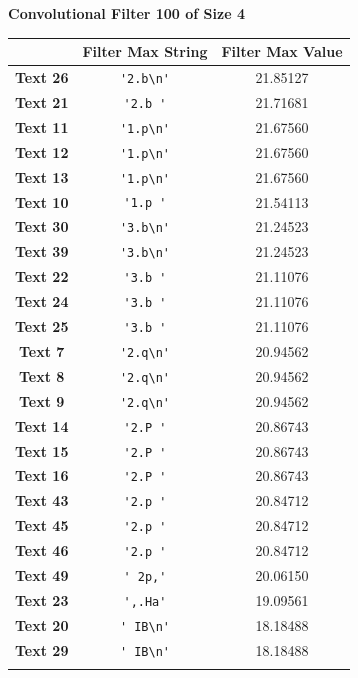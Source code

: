 \begin{table}
    \centering
    \textbf{Convolutional Filter 100 of Size 4}\par\medskip
    \begin{tabular}{c|cc}
        & \textbf{Filter Max String} & \textbf{Filter Max Value} \\ \hline
        \textbf{Text 26} & \verb{'2.b\n'{ & 21.85127 \\
        \textbf{Text 21} & \verb{'2.b '{ & 21.71681 \\
        \textbf{Text 11} & \verb{'1.p\n'{ & 21.67560 \\
        \textbf{Text 12} & \verb{'1.p\n'{ & 21.67560 \\
        \textbf{Text 13} & \verb{'1.p\n'{ & 21.67560 \\
        \textbf{Text 10} & \verb{'1.p '{ & 21.54113 \\
        \textbf{Text 30} & \verb{'3.b\n'{ & 21.24523 \\
        \textbf{Text 39} & \verb{'3.b\n'{ & 21.24523 \\
        \textbf{Text 22} & \verb{'3.b '{ & 21.11076 \\
        \textbf{Text 24} & \verb{'3.b '{ & 21.11076 \\
        \textbf{Text 25} & \verb{'3.b '{ & 21.11076 \\
        \textbf{Text 7} & \verb{'2.q\n'{ & 20.94562 \\
        \textbf{Text 8} & \verb{'2.q\n'{ & 20.94562 \\
        \textbf{Text 9} & \verb{'2.q\n'{ & 20.94562 \\
        \textbf{Text 14} & \verb{'2.P '{ & 20.86743 \\
        \textbf{Text 15} & \verb{'2.P '{ & 20.86743 \\
        \textbf{Text 16} & \verb{'2.P '{ & 20.86743 \\
        \textbf{Text 43} & \verb{'2.p '{ & 20.84712 \\
        \textbf{Text 45} & \verb{'2.p '{ & 20.84712 \\
        \textbf{Text 46} & \verb{'2.p '{ & 20.84712 \\
        \textbf{Text 49} & \verb{' 2p,'{ & 20.06150 \\
        \textbf{Text 23} & \verb{',.Ha'{ & 19.09561 \\
        \textbf{Text 20} & \verb{' IB\n'{ & 18.18488 \\
        \textbf{Text 29} & \verb{' IB\n'{ & 18.18488 \\
}}}}}}}}}}}}}}}}}}}}}}}}
\end{tabular}
\end{table}
